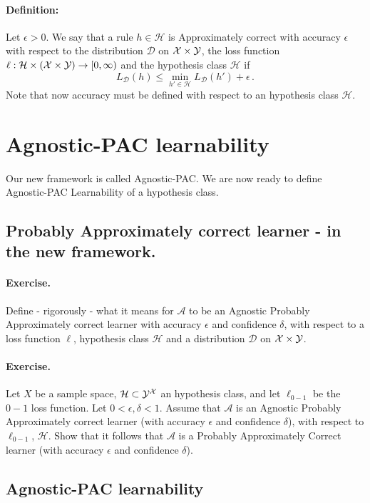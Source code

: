 \documentclass[11pt]{article}
\newcommand{\Ac}{\mathcal{A}}
\newcommand{\Dc}{\mathcal{D}}
\newcommand{\Hc}{\mathcal{H}}
\begin{document}
\paragraph{Definition:}
Let $\epsilon>0$.
We say that a rule $h\in\Hc$ is Approximately correct with accuracy $\epsilon$
with respect to the distribution $\Dc$ on $\mathcal{X}\times \mathcal{Y}$, the loss function
$\ell:\Hc\times (\X \times\Y)\to[0,\infty)$ and the hypothesis class $\Hc$ 
if 
\[
  L_\Dc(h) \leq \min_{h'\in\Hc} L_\Dc(h') + \epsilon\,.
\]
Note that now accuracy must be defined with respect to an hypothesis class
$\Hc$.



 \section{Agnostic-PAC learnability}
 Our new framework is called Agnostic-PAC.
 We are now ready to define Agnostic-PAC Learnability of a hypothesis class.

\subsection{Probably Approximately correct learner - in the new framework.}

\paragraph{Exercise.} Define - rigorously - what it means for $\Ac$ to be
an Agnostic Probably Approximately correct learner with accuracy $\epsilon$ and confidence
$\delta$, with respect to a loss function $\ell$, hypothesis class $\Hc$ and a
distribution $\Dc$ on $\mathcal{X}\times\mathcal{Y}$.
~\\
\paragraph{Exercise.} Let $X$ be a sample space, $\Hc\subset \Y^\X$ an
hypothesis class, and let $\ell_{0-1}$ be the $0-1$ loss function. Let
$0<\epsilon,\delta<1$. Assume that
$\Ac$ is an Agnostic Probably Approximately correct learner (with accuracy $\epsilon$ and confidence
$\delta$), with  respect to $\ell_{0-1}$, $\Hc$. Show that it follows
that $\Ac$ is a Probably Approximately Correct learner (with accuracy $\epsilon$ and confidence
$\delta$).


\subsection{Agnostic-PAC learnability}
\end{document}
